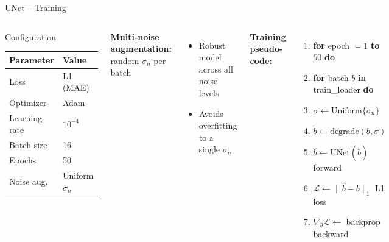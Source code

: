 \documentclass[english,10pt]{beamer}
\begin{document}
\begin{frame}{UNet -- Training}
  \begin{columns}
      \begin{block}{Configuration}
        \begin{tabular}{ll}\toprule
          \textbf{Parameter} & \textbf{Value}\\\midrule
          Loss & L1 (MAE)\\
          Optimizer & Adam\\
          Learning rate & $10^{-4}$\\
          Batch size & 16\\
          Epochs & 50\\
          Noise aug. & Uniform $\sigma_n$\\\bottomrule
        \end{tabular}
      \end{block}
      \vspace{0.2cm}
      \textbf{Multi-noise augmentation:}
      random $\sigma_n$ per batch
      \begin{itemize}
        \item Robust model across all noise levels
        \item Avoids overfitting to a single $\sigma_n$
      \end{itemize}
      \small
      \textbf{Training pseudo-code:}
      \vspace{0.15cm}
      \begin{enumerate}
        \item \textbf{for} epoch $=1$ \textbf{to} $50$ \textbf{do}
        \item \hspace{0.5cm}\textbf{for} batch $b$ \textbf{in} train\_loader \textbf{do}
        \item \hspace{1.0cm}$\sigma \gets \text{Uniform}\{\sigma_n\}$
        \item \hspace{1.0cm}$\tilde{b} \gets \text{degrade}(b, \sigma)$
        \item \hspace{1.0cm}$\hat{b} \gets \text{UNet}(\tilde{b})$ \hfill\tiny forward
        \item \hspace{1.0cm}$\mathcal{L} \gets \|\hat{b} - b\|_1$ \hfill\tiny L1 loss
        \item \hspace{1.0cm}$\nabla_\theta\mathcal{L} \gets$ backprop \hfill\tiny backward

\end{enumerate}
\end{columns}
\end{frame}
\end{document}
